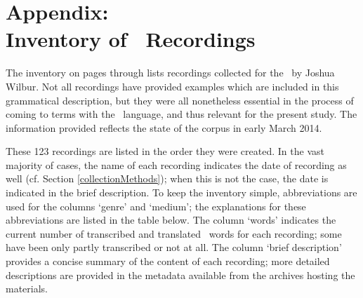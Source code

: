 %



\appendix%
\chapter*{Appendix: \\Inventory of \PS\ Recordings}
\label{inventory}\hypertarget{inventoryRef}{}
The inventory on pages \pageref{inventoryBegin} through \pageref{inventoryEnd} 
lists recordings collected for the \PSDP\ by Joshua Wilbur. Not all recordings have provided examples which are included in this grammatical description, but they were all nonetheless essential in the process of coming to terms with the \PS\ language, and thus relevant for the present study. 
The information provided reflects the state of the corpus in early March 2014. 

These 123 recordings are listed in the order they were created. In the vast majority of cases, the name of each recording indicates the date of recording as well (cf. Section \ref{collectionMethods}); when this is not the case, the date is indicated in the brief description. To keep the inventory simple, %
abbreviations are used for the columns ‘genre’ and ‘medium’; %
the explanations for these abbreviations are listed in the table below. %
The column ‘words’ indicates the current number of transcribed and translated \PS\ words for each recording; some have been only partly transcribed or not at all. 
The column ‘brief description’ provides a concise summary of the content of each recording; more detailed descriptions are provided in the metadata available from the archives hosting the materials. 

